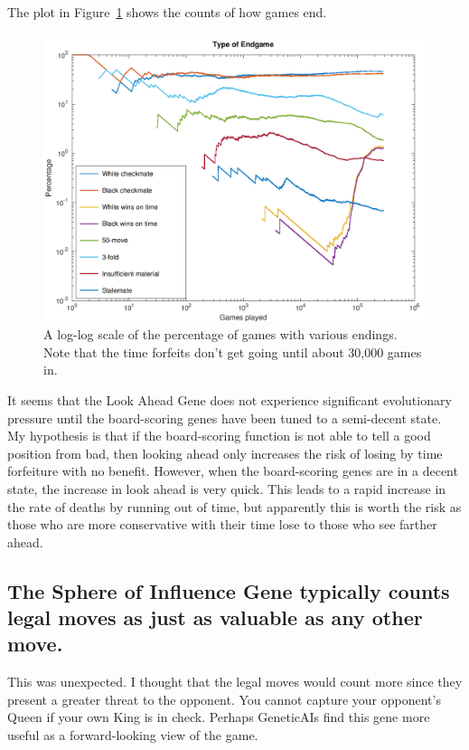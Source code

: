 \documentclass[letterpaper]{article}
\renewcommand\_{\textunderscore\allowbreak}
\begin{document}
The plot in Figure~\ref{game-ending-plot} shows the counts of how games end.
\begin{figure}[htb]
	\centering
	\includegraphics[width=\textwidth]{game-endings-log-plot}
	\caption{A log-log scale of the percentage of games with various endings. Note that the time forfeits don't get going until about 30,000 games in.}
	\label{game-ending-plot}
\end{figure}
It seems that the Look Ahead Gene does not experience significant evolutionary pressure until the board-scoring genes have been tuned to a semi-decent state. My hypothesis is that if the board-scoring function is not able to tell a good position from bad, then looking ahead only increases the risk of losing by time forfeiture with no benefit. However, when the board-scoring genes are in a decent state, the increase in look ahead is very quick. This leads to a rapid increase in the rate of deaths by running out of time, but apparently this is worth the risk as those who are more conservative with their time lose to those who see farther ahead.

\subsection{The Sphere of Influence Gene typically counts legal moves as just as valuable as any other move.}

This was unexpected. I thought that the legal moves would count more since they present a greater threat to the opponent. You cannot capture your opponent's Queen if your own King is in check. Perhaps Genetic\_AIs find this gene more useful as a forward-looking view of the game.
\end{document}
